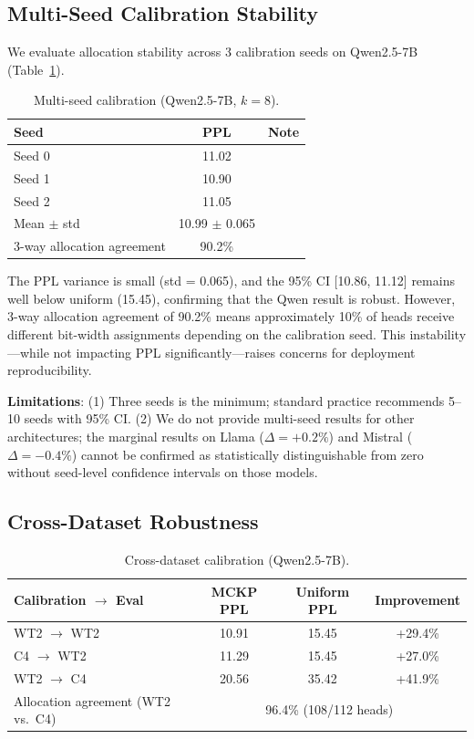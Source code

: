 \documentclass[11pt,a4paper]{article}
\begin{document}
\subsection{Multi-Seed Calibration Stability}

We evaluate allocation stability across 3 calibration seeds on Qwen2.5-7B (Table~\ref{tab:multiseed}).

\begin{table}[h]
\centering
\caption{Multi-seed calibration (Qwen2.5-7B, $k\!=\!8$).}
\label{tab:multiseed}
\small
\begin{tabular}{lcc}
\toprule
Seed & PPL & Note \\
\midrule
Seed 0 & 11.02 & \\
Seed 1 & 10.90 & \\
Seed 2 & 11.05 & \\
\midrule
Mean $\pm$ std & 10.99 $\pm$ 0.065 & \\
3-way allocation agreement & 90.2\% & \\
\bottomrule
\end{tabular}
\end{table}

The PPL variance is small (std = 0.065), and the 95\% CI [10.86, 11.12] remains well below uniform (15.45), confirming that the Qwen result is robust.
However, 3-way allocation agreement of 90.2\% means approximately 10\% of heads receive different bit-width assignments depending on the calibration seed.
This instability---while not impacting PPL significantly---raises concerns for deployment reproducibility.

\textbf{Limitations}: (1) Three seeds is the minimum; standard practice recommends 5--10 seeds with 95\% CI.
(2) We do not provide multi-seed results for other architectures; the marginal results on Llama ($\Delta = +0.2\%$) and Mistral ($\Delta = -0.4\%$) cannot be confirmed as statistically distinguishable from zero without seed-level confidence intervals on those models.

\subsection{Cross-Dataset Robustness}

\begin{table}[h]
\centering
\caption{Cross-dataset calibration (Qwen2.5-7B).}
\label{tab:cross_dataset}
\small
\begin{tabular}{lccc}
\toprule
Calibration $\to$ Eval & MCKP PPL & Uniform PPL & Improvement \\
\midrule
WT2 $\to$ WT2 & 10.91 & 15.45 & +29.4\% \\
C4 $\to$ WT2 & 11.29 & 15.45 & +27.0\% \\
WT2 $\to$ C4 & 20.56 & 35.42 & +41.9\% \\
\midrule
Allocation agreement (WT2 vs.\ C4) & \multicolumn{3}{c}{96.4\% (108/112 heads)} \\
\bottomrule
\end{tabular}
\end{table}
\end{document}
